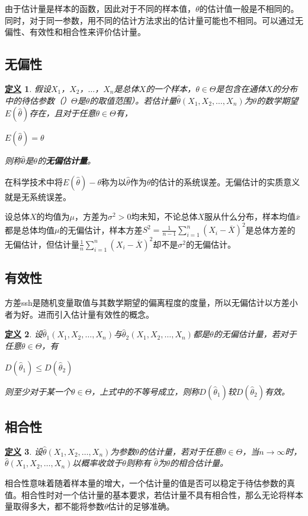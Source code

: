 \documentclass[11pt]{book}
\newcounter{#2}
\newcounter{#2}[#1]
\numberwithin{#2}{#1}
\newtheorem{newdef}{\textbf{\uline{定义}}}[chapter]
\begin{document}
由于估计量是样本的函数，因此对于不同的样本值，$\theta$的估计值一般是不相同的。同时，对于同一参数，用不同的估计方法求出的估计量可能也不相同。可以通过无偏性、有效性和相合性来评价估计量。
\subsection{无偏性}
\begin{newdef}
	假设$X_1$，$X_2$，$\dots$，$X_n$是总体$X$的一个样本，$\theta\in\Theta$是包含在通体$X$的分布中的待估参数（）$\Theta$是$\theta$的取值范围）。若估计量$\hat{\theta}(X_1,X_2,\dots,X_n)$为$\theta$的数学期望$E(\hat{\theta})$存在，且对于任意$\theta\in\Theta$有，
	\begin{center}
		$E(\hat{\theta})=\theta$
	\end{center}
则称$\hat{\theta}$是$\theta$的\textbf{无偏估计量}。
\end{newdef}

在科学技术中将$E(\hat{\theta})-\theta$称为以$\hat{\theta}$作为$\theta$的估计的系统误差。无偏估计的实质意义就是无系统误差。

设总体$X$的均值为$\mu $，方差为$\sigma^2>0$均未知，不论总体$X$服从什么分布，样本均值$\overline{x}$都是总体均值$\mu $的无偏估计，样本方差$ S^2 =\frac{1}{n-1}\sum\limits_{i=1}^{n}(X_i-\overline{X})^2$是总体方差的无偏估计，但估计量$ \frac{1}{n}\sum\limits_{i=1}^{n}(X_i-\overline{X})^2$却不是$\sigma^2$的无偏估计。
\subsection{有效性}
方差ssh是随机变量取值与其数学期望的偏离程度的度量，所以无偏估计以方差小者为好。进而引入估计量有效性的概念。
\begin{newdef}
	设$\hat{\theta}_1(X_1,X_2,\dots,X_n)$与$\hat{\theta}_2(X_1,X_2,\dots,X_n)$都是$\theta$的无偏估计量，若对于任意$\theta\in\Theta$，有
	\begin{center}
		$D(\hat{\theta}_1) \le D(\hat{\theta}_2)$
	\end{center}
	则至少对于某一个$\theta\in\Theta$，上式中的不等号成立，则称$D(\hat{\theta}_1)$较$D(\hat{\theta}_2)$有效。
\end{newdef}
\subsection{相合性}
\begin{newdef}
	设$\hat{\theta}(X_1,X_2,\dots,X_n)$为参数$\theta$的估计量，若对于任意$\theta\in\Theta$，当$n\to\infty$时，$\hat{\theta}(X_1,X_2,\dots,X_n)$以概率收敛于$\theta$则称有
	$\hat{\theta}$为$\theta$的相合估计量。
\end{newdef}
相合性意味着随着样本量的增大，一个估计量的值是否可以稳定于待估参数的真值。相合性时对一个估计量的基本要求，若估计量不具有相合性，那么无论将样本量取得多大，都不能将参数$\theta$估计的足够准确。
	
\end{document}
